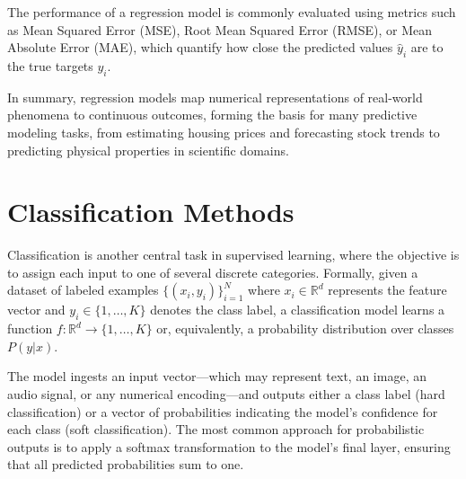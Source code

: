 \documentclass[12pt,a4paper]{report}
\begin{document}
\vspace{0.5em}
The performance of a regression model is commonly evaluated using metrics such as 
Mean Squared Error (MSE), Root Mean Squared Error (RMSE), or Mean Absolute Error (MAE), 
which quantify how close the predicted values $\hat{y}_i$ are to the true targets $y_i$.

\vspace{0.5em}
In summary, regression models map numerical representations of real-world phenomena 
to continuous outcomes, forming the basis for many predictive modeling tasks, 
from estimating housing prices and forecasting stock trends to predicting physical 
properties in scientific domains.

\section{Classification Methods}

Classification is another central task in supervised learning, where the objective is to assign 
each input to one of several discrete categories. Formally, given a dataset of labeled examples 
$\{(x_i, y_i)\}_{i=1}^N$ where $x_i \in \mathbb{R}^d$ represents the feature vector and 
$y_i \in \{1, \dots, K\}$ denotes the class label, a classification model learns a function 
$f: \mathbb{R}^d \rightarrow \{1, \dots, K\}$ or, equivalently, a probability distribution 
over classes $P(y|x)$.

\vspace{0.5em}
The model ingests an input vector---which may represent text, an image, an audio signal, or any 
numerical encoding---and outputs either a class label (hard classification) or a vector of 
probabilities indicating the model’s confidence for each class (soft classification). 
The most common approach for probabilistic outputs is to apply a softmax transformation 
to the model’s final layer, ensuring that all predicted probabilities sum to one.
\end{document}
